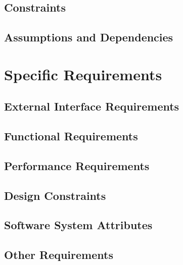 \documentclass{article}
\begin{document}
	\subsection{Constraints}
	
	
	\subsection{Assumptions and Dependencies}
	
	
\section{Specific Requirements}
	\subsection{External Interface Requirements}
	
	
	\subsection{Functional Requirements}
	
	
	\subsection{Performance Requirements}
	
	
	\subsection{Design Constraints}
	
	
	\subsection{Software System Attributes}
	
	
	\subsection{Other Requirements}
	
\end{document}
